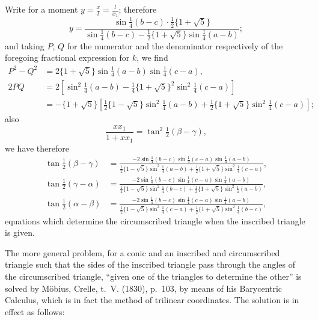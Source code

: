 \documentclass[11pt,a4paper]{book}
\begin{document}
Write for a moment $y = \frac{x}{l} = \frac{l}{x_1}$; therefore
\[
y = \frac{\sin\tfrac{1}{4}(b - c)\cdot\tfrac{1}{2}\{1 + \sqrt{5}\}}{\sin\tfrac{1}{4}(b - c) - \tfrac{1}{2}\{1 + \sqrt{5}\}\sin\tfrac{1}{4}(a - b)};
\]
and taking $P$, $Q$ for the numerator and the denominator respectively of the foregoing fractional expression for $k$, we find
\begin{align*}
P^2 - Q^2 &= 2\{1 + \sqrt{5}\}\sin\tfrac{1}{4}(a - b)\sin\tfrac{1}{4}(c - a),\\
2PQ &= 2\left[\sin^2\tfrac{1}{4}(a - b) - \tfrac{1}{4}\{1 + \sqrt{5}\}^2\sin^2\tfrac{1}{4}(c - a)\right]\\
&= -\{1 + \sqrt{5}\}\left[\tfrac{1}{2}\{1 - \sqrt{5}\}\sin^2\tfrac{1}{4}(a - b) + \tfrac{1}{2}\{1 + \sqrt{5}\}\sin^2\tfrac{1}{4}(c - a)\right];
\end{align*}
also
\[
\frac{xx_1}{1 + xx_1} = \tan^2\tfrac{1}{2}(\beta - \gamma),
\]
we have therefore
\begin{align*}
\tan\tfrac{1}{2}(\beta - \gamma) &= \frac{-2\sin\tfrac{1}{4}(b - c)\sin\tfrac{1}{4}(c - a)\sin\tfrac{1}{4}(a - b)}{\tfrac{1}{2}\{1 - \sqrt{5}\}\sin^2\tfrac{1}{4}(a - b) + \tfrac{1}{2}\{1 + \sqrt{5}\}\sin^2\tfrac{1}{4}(c - a)},\\
\tan\tfrac{1}{2}(\gamma - \alpha) &= \frac{-2\sin\tfrac{1}{4}(b - c)\sin\tfrac{1}{4}(c - a)\sin\tfrac{1}{4}(a - b)}{\tfrac{1}{2}\{1 - \sqrt{5}\}\sin^2\tfrac{1}{4}(b - c) + \tfrac{1}{2}\{1 + \sqrt{5}\}\sin^2\tfrac{1}{4}(a - b)},\\
\tan\tfrac{1}{2}(\alpha - \beta) &= \frac{-2\sin\tfrac{1}{4}(b - c)\sin\tfrac{1}{4}(c - a)\sin\tfrac{1}{4}(a - b)}{\tfrac{1}{2}\{1 - \sqrt{5}\}\sin^2\tfrac{1}{4}(c - a) + \tfrac{1}{2}\{1 + \sqrt{5}\}\sin^2\tfrac{1}{4}(b - c)},
\end{align*}
equations which determine the circumscribed triangle when the inscribed triangle is given.

The more general problem, for a conic and an inscribed and circumscribed triangle such that the sides of the inscribed triangle pass through the angles of the circumscribed triangle, ``given one of the triangles to determine the other'' is solved by M\"{o}bius, Crelle, t.~V. (1830), p.~103, by means of his Barycentric Calculus, which is in fact the method of trilinear coordinates. The solution is in effect as follows:
\end{document}
